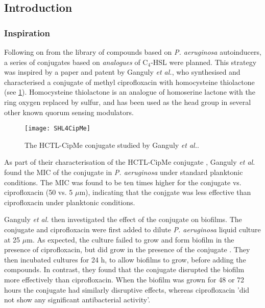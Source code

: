 \subsection{Introduction}

\subsubsection{Inspiration}

Following on from the library of compounds based on \textit{P. aeruginosa} autoinducers, a series of conjugates based on \textit{analogues} of C$_4$-HSL were planned. This strategy was inspired by a paper\cite{Ganguly2011} and patent\cite{Iyer2012} by Ganguly \textit{et al.}, who synthesised and characterised a conjugate  of methyl ciprofloxacin with homocysteine thiolactone (see \ref{fig:SHL4CipMe}). Homocysteine thiolactone is an analogue of homoserine lactone with the ring oxygen replaced by sulfur, and has been used as the head group in several other known quorum sensing modulators\cite{Eberhard1986,Schaefer1996,Passador1996,Smith2003,Chhabra1993,McInnis2011,Geske2007,Janssens2007}.

\begin{figure}[H]
	\begin{center}
		\texttt{[image: SHL4CipMe]}
		\caption{The HCTL-CipMe conjugate  studied by Ganguly \textit{et al.}\cite{Ganguly2011,Iyer2012}.\label{fig:SHL4CipMe}}
	\end{center}
\end{figure}


As part of their characterisation of the HCTL-CipMe conjugate , Ganguly \textit{et al.} found the MIC of the conjugate in \textit{P. aeruginosa} under standard planktonic conditions. 
The MIC was found to be ten times higher for the conjugate vs. ciprofloxacin (50 vs. 5 $\mu$m), indicating that the conjgate was less effective than ciprofloxacin under planktonic conditions. 

Ganguly \textit{et al.} then investigated the effect of the conjugate on biofilms. 
The conjugate and ciprofloxacin were first added to dilute \textit{P. aeruginosa} liquid culture at 25 $\mu$m. 
As expected, the culture failed to grow and form biofilm in the presence of ciprofloxacin, but did grow in the presence of the conjugate . 
They then incubated cultures for 24 h, to allow biofilms to grow, before adding the compounds. In contrast, they found that the conjugate  disrupted the biofilm more effectively than ciprofloxacin. 
When the biofilm was grown for 48 or 72 hours the conjugate had similarly disruptive effects, whereas ciprofloxacin 'did not show any significant antibacterial activity'.

